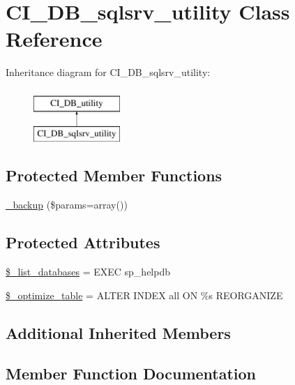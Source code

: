 \hypertarget{class_c_i___d_b__sqlsrv__utility}{}\section{C\+I\+\_\+\+D\+B\+\_\+sqlsrv\+\_\+utility Class Reference}
\label{class_c_i___d_b__sqlsrv__utility}
Inheritance diagram for C\+I\+\_\+\+D\+B\+\_\+sqlsrv\+\_\+utility\+:\begin{figure}[H]
\begin{center}
\leavevmode
\includegraphics[height=2.000000cm]{class_c_i___d_b__sqlsrv__utility}
\end{center}
\end{figure}
\subsection*{Protected Member Functions}
\begin{DoxyCompactItemize}
\item 
\hyperlink{class_c_i___d_b__sqlsrv__utility_a30f3053d2c82e7562349924363507afa}{\+\_\+backup} (\$params=array())
\end{DoxyCompactItemize}
\subsection*{Protected Attributes}
\begin{DoxyCompactItemize}
\item 
\hyperlink{class_c_i___d_b__sqlsrv__utility_afe3a5b80562d93d6bc7e2b53c95b7e5a}{\$\+\_\+list\+\_\+databases} = \textquotesingle{}E\+X\+E\+C sp\+\_\+helpdb\textquotesingle{}
\item 
\hyperlink{class_c_i___d_b__sqlsrv__utility_a083199e5c22c78912dae0a47bb2d7fad}{\$\+\_\+optimize\+\_\+table} = \textquotesingle{}A\+L\+T\+E\+R I\+N\+D\+E\+X all O\+N \%s R\+E\+O\+R\+G\+A\+N\+I\+Z\+E\textquotesingle{}
\end{DoxyCompactItemize}
\subsection*{Additional Inherited Members}


\subsection{Member Function Documentation}
\hypertarget{class_c_i___d_b__sqlsrv__utility_a30f3053d2c82e7562349924363507afa}{}

